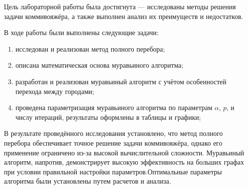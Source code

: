 
\vspace{0.5cm}
Цель лабораторной работы была достигнута — исследованы методы решения задачи коммивояжёра, а также выполнен анализ их преимуществ и недостатков. 

\vspace{0.5cm}
В ходе работы были выполнены следующие задачи:
\begin{enumerate}
    \item исследован и реализован метод полного перебора;
    \item описана математическая основа муравьиного алгоритма;
    \item разработан и реализован муравьиный алгоритм с учётом особенностей перехода между городами;
    \item проведена параметризация муравьиного алгоритма по параметрам $\alpha$, $p$, и числу итераций, результаты оформлены в таблицы и графики;
\end{enumerate}

\vspace{0.5cm}
В результате проведённого исследования установлено, что метод полного перебора обеспечивает точное решение задачи коммивояжёра, однако его применение ограничено из-за высокой вычислительной сложности. Муравьиный алгоритм, напротив, демонстрирует высокую эффективность на больших графах при условии правильной настройки параметров.Оптимальные параметры алгоритма были установлены путем расчетов и анализа.


